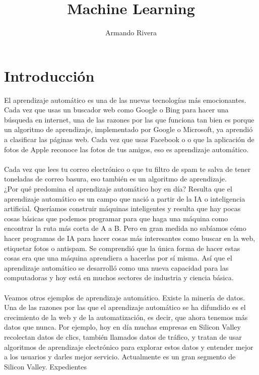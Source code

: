 \documentclass{book}
\author{Armando Rivera}
\title{Machine Learning}
\begin{document}
\maketitle
\renewcommand{\tablename}{Tabla}
\renewcommand{\listtablename}{Índice de tablas}
\tableofcontents
\listoffigures
\listoftables
\chapter{Introducción}
El aprendizaje automático es una
de las nuevas tecnologías más emocionantes. Cada vez que usas un buscador web como Google o Bing para hacer una
búsqueda en internet, una de las razones por las que funciona tan bien es porque
un algoritmo de aprendizaje, implementado por Google o Microsoft, ya aprendió a clasificar las
páginas web. Cada vez que usas Facebook o o que la aplicación de fotos de Apple
reconoce las fotos de tus amigos, eso es aprendizaje automático. \\\\Cada vez que lees
tu correo electrónico o que tu filtro de spam te salva de tener toneladas de correo basura,
eso también es un algoritmo de aprendizaje.\\¿Por qué
predomina el aprendizaje automático hoy en día? Resulta que el aprendizaje automático es un
campo que nació a partir de la IA o inteligencia artificial. Queríamos
construir máquinas inteligentes y resulta que hay pocas cosas básicas que
podemos programar para que haga una máquina como encontrar la ruta más corta de A a B.
Pero en gran medida no sabíamos cómo hacer programas de IA para hacer cosas
más interesantes como buscar en la web, etiquetar fotos o antispam. Se comprendió
que la única forma de hacer estas cosas era que una máquina aprendiera
a hacerlas por sí misma. Así que el aprendizaje automático se desarrolló como una nueva capacidad
para las computadoras y hoy está en muchos sectores de industria y ciencia básica.\\\\Veamos otros ejemplos de aprendizaje automático. Existe la minería de datos.
Una de las razones por las que el aprendizaje automático se ha difundido es el crecimiento de la web y
de la automatización, es decir, que ahora tenemos más datos que
nunca. Por ejemplo, hoy en día muchas empresas en Silicon Valley recolectan datos de
clics, también llamados datos de tráfico, y tratan de usar algoritmos de aprendizaje
electrónico para explorar estos datos y entender mejor a los usuarios y darles
mejor servicio. Actualmente es un gran segmento de Silicon Valley. Expedientes
\end{document}
